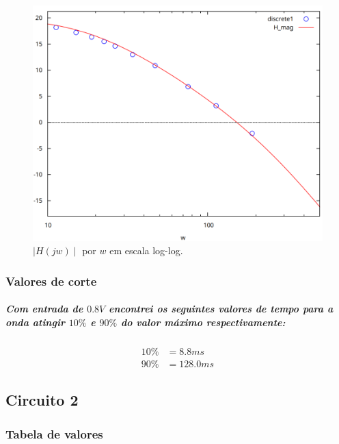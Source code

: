 \documentclass[12pt,twoside, a4paper, twocolumn]{article}
\begin{document}
\begin{figure}[h]
    \centering
    \includegraphics[width=1\columnwidth]{images/H1loglog.png}
    \caption{ $\mid H(jw) \mid$ por $w$ em escala log-log.}
\end{figure}




\subsubsection{Valores de corte}


\subparagraph*{Com entrada de $0.8V$ encontrei os seguintes valores de tempo para a onda atingir $10\%$  e $90\%$ do valor máximo respectivamente:}


\begin{equation}
    \begin{aligned}
        10\% & = 8.8ms   \\
        90\% & = 128.0ms
    \end{aligned}
\end{equation}




\newpage


\subsection{Circuito 2}


\subsubsection{Tabela de valores}
\end{document}
